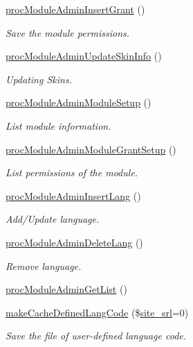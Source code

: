 \begin{DoxyCompactItemize}
\hyperlink{classmoduleAdminController_ac0d7a96f80e9c24260292f3caa9552e6}{proc\-Module\-Admin\-Insert\-Grant} ()
\begin{DoxyCompactList}\small\item\em Save the module permissions. \end{DoxyCompactList}\item 
\hyperlink{classmoduleAdminController_a299f612ff66da380ee8633fd8d79f777}{proc\-Module\-Admin\-Update\-Skin\-Info} ()
\begin{DoxyCompactList}\small\item\em Updating Skins. \end{DoxyCompactList}\item 
\hyperlink{classmoduleAdminController_a7a4a202f2249823182f5aab39709f45e}{proc\-Module\-Admin\-Module\-Setup} ()
\begin{DoxyCompactList}\small\item\em List module information. \end{DoxyCompactList}\item 
\hyperlink{classmoduleAdminController_aab0e773fbdbac7faf7e0073aeb94b77d}{proc\-Module\-Admin\-Module\-Grant\-Setup} ()
\begin{DoxyCompactList}\small\item\em List permissions of the module. \end{DoxyCompactList}\item 
\hyperlink{classmoduleAdminController_a302990c618bc055b581dbf26722b3560}{proc\-Module\-Admin\-Insert\-Lang} ()
\begin{DoxyCompactList}\small\item\em Add/\-Update language. \end{DoxyCompactList}\item 
\hyperlink{classmoduleAdminController_a4d0ac7d6d5266f01ede9961723d60f4f}{proc\-Module\-Admin\-Delete\-Lang} ()
\begin{DoxyCompactList}\small\item\em Remove language. \end{DoxyCompactList}\item 
\hyperlink{classmoduleAdminController_a34878c363345d5c055ec6f277bddc635}{proc\-Module\-Admin\-Get\-List} ()
\item 
\hyperlink{classmoduleAdminController_ab5a6fbd43777fcb5af9cee6e7b529291}{make\-Cache\-Defined\-Lang\-Code} (\$\hyperlink{ko_8install_8php_a8b1406b4ad1048041558dce6bfe89004}{site\-\_\-srl}=0)
\begin{DoxyCompactList}\small\item\em Save the file of user-\/defined language code. \end{DoxyCompactList}\item 

\end{DoxyCompactItemize}
